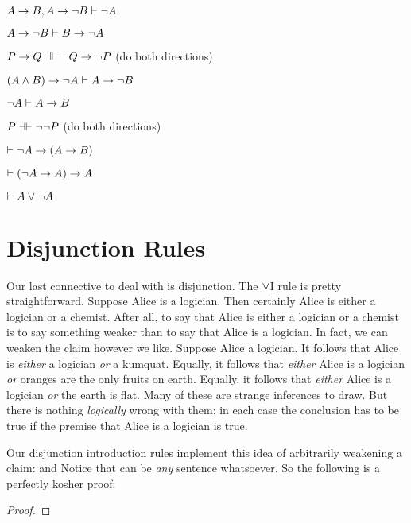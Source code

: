 \practiceproblems


\begin{earg}
\item $A \rightarrow B, A \rightarrow \neg B \vdash \neg A$
\item $A \rightarrow \neg B \vdash B \rightarrow \neg A$
\item $P \eif Q \pequiv \enot Q \eif \enot P$ (do both directions)
\item $(A \wedge B) \rightarrow \neg A \vdash A \rightarrow \neg B$
\item $\neg A \vdash A \rightarrow B$
\item $P \pequiv \enot \enot P$ (do both directions)
\item $\vdash \neg A \rightarrow( A \rightarrow B)$
\item $\vdash (\neg A \rightarrow A) \rightarrow A$
\item $\vdash A \vee \neg A$
\end{earg}



\section{Disjunction Rules}
Our last connective to deal with is disjunction.  The $\vee$I rule is pretty straightforward.  Suppose Alice is a logician. Then certainly Alice is either a logician or a chemist. After all, to say that Alice is either a logician or a chemist is to say something weaker than to say that Alice is a logician. In fact, we can weaken the claim however we like. Suppose Alice a logician. It follows that Alice is \emph{either} a logician \emph{or} a kumquat. Equally, it follows that \emph{either} Alice is a logician \emph{or} oranges are the only fruits on earth.  Equally, it follows that \emph{either} Alice is a logician \emph{or} the earth is flat. Many of these are strange inferences to draw. But there is nothing \emph{logically} wrong with them: in each case the conclusion has to be true if the premise that Alice is a logician is true.


Our disjunction introduction rules implement this idea of arbitrarily weakening a claim:
and
Notice that \meta{\psi} can be \emph{any} sentence whatsoever. So the following is a perfectly kosher proof:
\begin{proof}
\end{proof}


